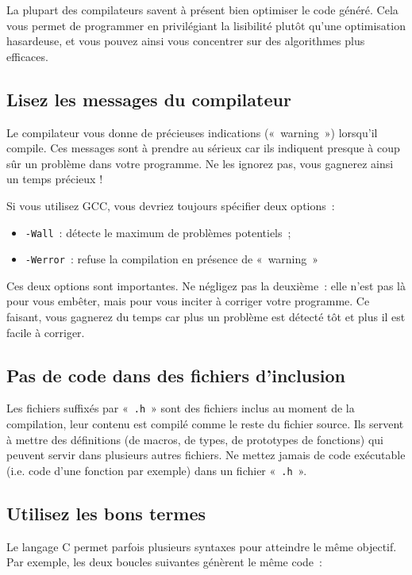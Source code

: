 \documentclass {article}
\begin{document}
La plupart des compilateurs savent à présent bien optimiser le code
généré. Cela vous permet de programmer en privilégiant la lisibilité
plutôt qu'une optimisation hasardeuse, et vous pouvez ainsi vous
concentrer sur des algorithmes plus efficaces.


\subsection {Lisez les messages du compilateur}

Le compilateur vous donne de précieuses indications («~warning~»)
lorsqu'il compile. Ces messages sont à prendre au sérieux car ils
indiquent presque à coup sûr un problème dans votre programme. Ne
les ignorez pas, vous gagnerez ainsi un temps précieux !

Si vous utilisez GCC, vous devriez toujours spécifier deux options~:
\begin {itemize}
    \item \texttt {-Wall}~: détecte le maximum de problèmes potentiels~;
    \item \texttt {-Werror}~: refuse la compilation en présence de
	«~warning~»
\end {itemize}

Ces deux options sont importantes. Ne négligez pas la deuxième~: elle
n'est pas là pour vous embêter, mais pour vous inciter à corriger votre
programme. Ce faisant, vous gagnerez du temps car plus un problème est
détecté tôt et plus il est facile à corriger.

\subsection {Pas de code dans des fichiers d'inclusion}

Les fichiers suffixés par «~\texttt {.h}~» sont des fichiers inclus
au moment de la compilation, leur contenu est compilé comme le reste
du fichier source. Ils servent à mettre des définitions (de macros,
de types, de prototypes de fonctions) qui peuvent servir dans plusieurs
autres fichiers. Ne mettez jamais de code exécutable (i.e. code d'une
fonction par exemple) dans un fichier «~\texttt {.h}~».


\subsection {Utilisez les bons termes}

Le langage C permet parfois plusieurs syntaxes pour atteindre le même
objectif. Par exemple, les deux boucles suivantes génèrent le même
code~:
\end{document}
